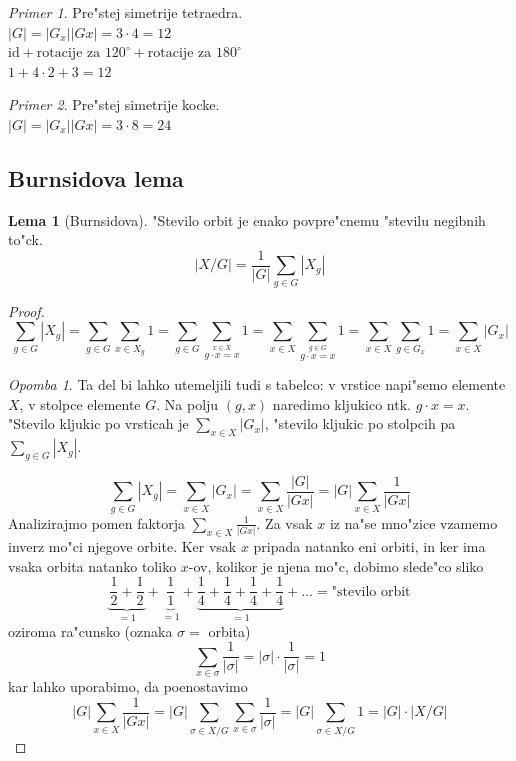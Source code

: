 \documentclass[a4paper,12pt]{article}
\theoremstyle{definition}
\newtheorem{lemma}[counter]{Lema}
\theoremstyle{remark}
\newtheorem*{ex}{Primer}
\newtheorem*{rem}{Opomba}
\begin{document}
\begin{ex}
	Pre"stej simetrije tetraedra.\\
	$|G| = |G_x||Gx| = 3 \cdot 4 = 12$\\
	$\text{id} + \text{rotacije za }120^{\circ} + \text{rotacije za }180^{\circ}$\\
	$1 + 4 \cdot 2 + 3 = 12$
\end{ex}
\begin{ex}
	Pre"stej simetrije kocke.\\
	$|G| = |G_x||Gx| = 3 \cdot 8 = 24$
\end{ex}


\subsection{Burnsidova lema}
\begin{lemma}[Burnsidova]
	"Stevilo orbit je enako povpre"cnemu "stevilu negibnih to"ck.
	$$|X/G| = \frac{1}{|G|}\sum_{g \in G}|X_g|$$
\end{lemma}
\begin{proof}
	$$\sum_{g \in G}|X_g| = \sum_{g \in G}\sum_{x \in X_g}1 = \sum_{g \in G}\sum_{\stackrel{x\in X}{g \cdot x = x}}1 = \sum_{x \in X}\sum_{\stackrel{g \in G}{g \cdot x = x}}1 = \sum_{x \in X}\sum_{g \in G_x}1 = \sum_{x\in X}|G_x|$$
	\begin{rem}
		Ta del bi lahko utemeljili tudi s tabelco: v vrstice napi"semo elemente $X$, v stolpce elemente $G$. Na polju $(g, x)$ naredimo kljukico ntk. $g \cdot x = x$. "Stevilo kljukic po vrsticah je $\sum_{x\in X}|G_x|$, "stevilo kljukic po stolpcih pa $\sum_{g \in G}|X_g|$.
	\end{rem}
	$$\sum_{g \in G}|X_g| = \sum_{x\in X}|G_x| = \sum_{x \in X}\frac{|G|}{|Gx|} = |G| \sum_{x \in X}\frac{1}{|Gx|}$$
	Analizirajmo pomen faktorja $\sum_{x \in X}\frac{1}{|Gx|}$. Za vsak $x$ iz na"se mno"zice vzamemo inverz mo"ci njegove orbite. Ker vsak $x$ pripada natanko eni orbiti, in ker ima vsaka orbita natanko toliko $x$-ov, kolikor je njena mo"c, dobimo slede"co sliko
	$$
	\underbrace{\frac{1}{2}+\frac{1}{2}}_{=1} +
	\underbrace{\frac{1}{1}}_{=1} +
	\underbrace{\frac{1}{4}+\frac{1}{4}+\frac{1}{4}+\frac{1}{4}}_{=1} +
	\ldots
	= \text{"stevilo orbit}
	$$
	oziroma ra"cunsko (oznaka $\sigma =$ orbita)
	$$\sum_{x \in \sigma}\frac{1}{|\sigma|} = |\sigma| \cdot \frac{1}{|\sigma|} = 1$$
	kar lahko uporabimo, da poenostavimo
	$$|G| \sum_{x \in X}\frac{1}{|Gx|} = |G| \sum_{\sigma \in X/G}\sum_{x \in \sigma}\frac{1}{|\sigma|} = |G| \sum_{\sigma \in X/G}1 = |G| \cdot |X/G|$$
\end{proof}
\end{document}
